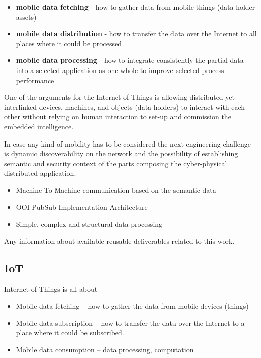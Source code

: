 \documentclass[
]{article}
\providecommand{\tightlist}{%
  \setlength{\itemsep}{0pt}\setlength{\parskip}{0pt}}
\begin{document}
\begin{itemize}
\tightlist
\item
  \textbf{mobile data fetching} - how to gather data from mobile things
  (data holder assets)
\item
  \textbf{mobile data distribution} - how to transfer the data over the
  Internet to all places where it could be processed
\item
  \textbf{mobile data processing} - how to integrate consistently the
  partial data into a selected application as one whole to improve
  selected process performance
\end{itemize}

One of the arguments for the Internet of Things is allowing distributed
yet interlinked devices, machines, and objects (data holders) to
interact with each other without relying on human interaction to set-up
and commission the embedded intelligence.

In case any kind of mobility has to be considered the next engineering
challenge is dynamic discoverability on the network and the possibility
of establishing semantic and security context of the parts composing the
cyber-physical distributed application.

\begin{itemize}
\tightlist
\item
  Machine To Machine communication based on the semantic-data
\item
  OOI PubSub Implementation Architecture
\item
  Simple, complex and structural data processing
\end{itemize}

Any information about available reusable deliverables related to this
work.

\hypertarget{iot}{%
\subsection{IoT}\label{iot}}

Internet of Things is all about

\begin{itemize}
\tightlist
\item
  Mobile data fetching -- how to gather the data from mobile devices
  (things)
\item
  Mobile data subscription -- how to transfer the data over the Internet
  to a place where it could be subscribed.
\item
  Mobile data consumption -- data processing, computation
\end{itemize}
\end{document}
